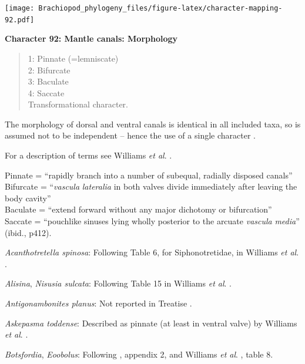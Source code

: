 \documentclass[openany]{book}
\theoremstyle{definition}
\theoremstyle{definition}
\theoremstyle{definition}
\theoremstyle{remark}
\begin{document}
\texttt{[image: Brachiopod\_phylogeny\_files/figure-latex/character-mapping-92.pdf]}

\textbf{Character 92: Mantle canals: Morphology}

\begin{quote}
1: Pinnate (=lemniscate)\\
2: Bifurcate\\
3: Baculate\\
4: Saccate\\
Transformational character.
\end{quote}

The morphology of dorsal and ventral canals is identical in all included
taxa, so is assumed not to be independent -- hence the use of a single
character \citep[contra][]{Williams2000LinguliformeaCraniiformea}.

For a description of terms see Williams \emph{et al}.
\citeyearpar[2000]{Williams1997Introduction}.

Pinnate = ``rapidly branch into a number of subequal, radially disposed
canals''\\
Bifurcate = ``\emph{vascula} \emph{lateralia} in both valves divide
immediately after leaving the body cavity''\\
Baculate = ``extend forward without any major dichotomy or bifurcation''
\citep[ p.~418]{Williams1997Introduction}\\
Saccate = ``pouchlike sinuses lying wholly posterior to the arcuate
\emph{vascula} \emph{media}'' (ibid., p412).

\hypertarget{Acanthotretella_spinosa-coding-92}{}
\emph{Acanthotretella spinosa}: Following Table 6, for Siphonotretidae,
in Williams \emph{et al}.
\citeyearpar{Williams2000LinguliformeaCraniiformea}.

\hypertarget{Alisina-coding-92}{}
\emph{Alisina}, \emph{Nisusia sulcata}: Following Table 15 in Williams
\emph{et al}. \citeyearpar{Williams2000LinguliformeaCraniiformea}.

\hypertarget{Antigonambonites_planus-coding-92}{}
\emph{Antigonambonites planus}: Not reported in Treatise
\citep{Williams2000LinguliformeaCraniiformea}.

\hypertarget{Askepasma_toddense-coding-92}{}
\emph{Askepasma toddense}: Described as pinnate (at least in ventral
valve) by Williams \emph{et al}.
\citeyearpar[p.~250]{Williams1998Thediversity}.

\hypertarget{Botsfordia-coding-92}{}
\emph{Botsfordia}, \emph{Eoobolus}: Following
\citet{Williams1998Thediversity}, appendix 2, and Williams \emph{et al}.
\citeyearpar{Williams2000LinguliformeaCraniiformea}, table 8.
\end{document}
